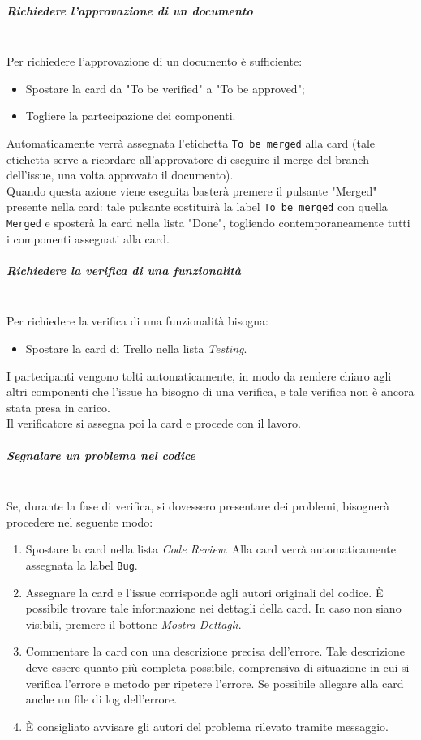 \subparagraph{Richiedere l'approvazione di un documento}
\mbox{}\\
Per richiedere l'approvazione di un documento è sufficiente:
\begin{itemize}
    \item Spostare la card da "To be verified" a "To be approved";
    \item Togliere la partecipazione dei componenti.
\end{itemize}  
Automaticamente verrà assegnata l'etichetta \texttt{To be merged} alla card (tale etichetta serve a ricordare all'approvatore 
di eseguire il merge del branch dell'issue, una volta approvato il documento).\\
Quando questa azione viene eseguita basterà premere il pulsante "Merged" presente nella card: tale pulsante sostituirà la label 
\texttt{To be merged} con quella \texttt{Merged} e sposterà la card nella lista "Done", togliendo contemporaneamente tutti i 
componenti assegnati alla card.

\subparagraph{Richiedere la verifica di una funzionalità}
\mbox{}\\
Per richiedere la verifica di una funzionalità bisogna:
\begin{itemize}
    \item Spostare la card di Trello nella lista \textit{Testing}.
\end{itemize} 
I partecipanti vengono tolti automaticamente, in modo da rendere chiaro agli altri componenti che l'issue ha bisogno di una verifica, e tale verifica non è ancora stata presa in carico.\\
Il verificatore si assegna poi la card e procede con il lavoro.

\subparagraph{Segnalare un problema nel codice}
\mbox{}\\
Se, durante la fase di verifica, si dovessero presentare dei problemi, bisognerà procedere nel seguente modo:
\begin{enumerate}
    \item Spostare la card nella lista \textit{Code Review}. Alla card verrà automaticamente assegnata la label \texttt{Bug}.
    \item Assegnare la card e l'issue corrisponde agli autori originali del codice. È possibile trovare tale informazione nei dettagli della card. In caso non siano visibili, premere il bottone \textit{Mostra Dettagli}.
    \item Commentare la card con una descrizione precisa dell'errore. Tale descrizione deve essere quanto più completa possibile, comprensiva di situazione in cui si verifica l'errore e metodo per ripetere l'errore. Se possibile allegare alla card anche un file di log dell'errore.
    \item È consigliato avvisare gli autori del problema rilevato tramite messaggio.
\end{enumerate}

